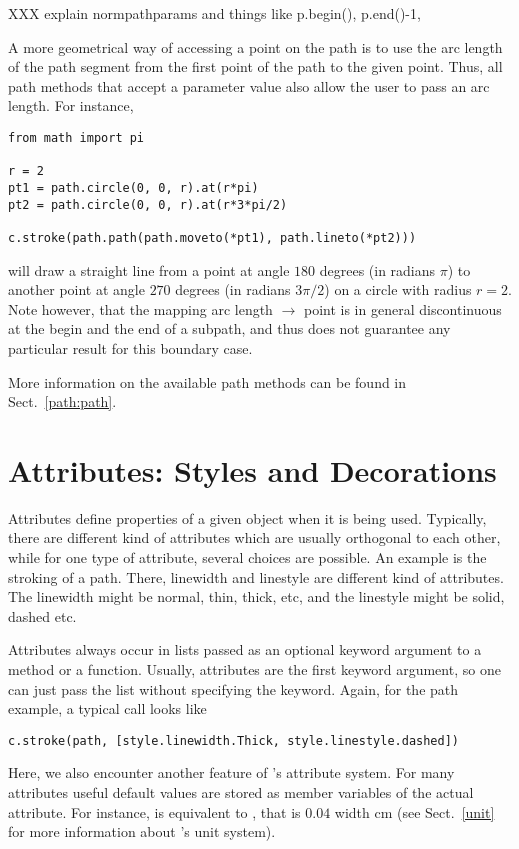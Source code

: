 XXX explain normpathparams and things like p.begin(), p.end()-1,

A more geometrical way of accessing a point on the path is to use the
arc length of the path segment from the first point of the path to the
given point. Thus, all \PyX{} path methods that accept a parameter
value also allow the user to pass an arc length. For instance,
\begin{verbatim}
from math import pi

r = 2
pt1 = path.circle(0, 0, r).at(r*pi)
pt2 = path.circle(0, 0, r).at(r*3*pi/2)

c.stroke(path.path(path.moveto(*pt1), path.lineto(*pt2)))
\end{verbatim}
will draw a straight line from a point at angle $180$ degrees (in
radians $\pi$) to another point at angle $270$ degrees (in radians
$3\pi/2$) on a circle with radius $r=2$. Note however, that the mapping arc
length $\to$ point is in general discontinuous at the begin and the
end of a subpath, and thus \PyX{} does not guarantee any particular
result for this boundary case.

More information on the available path methods can be found 
in Sect.~\ref{path:path}. 

\section{Attributes: Styles and Decorations}

\label{graphics:attributes}

Attributes define properties of a given object when it is being used.
Typically, there are different kind of attributes which are usually
orthogonal to each other, while for one type of attribute, several
choices are possible. An example is the stroking of a path. There,
linewidth and linestyle are different kind of attributes. The linewidth
might be normal, thin, thick, etc, and the linestyle might be solid,
dashed etc.

Attributes always occur in lists passed as an optional keyword argument
to a method or a function. Usually, attributes are the first keyword
argument, so one can just pass the list without specifying the keyword.
Again, for the path example, a typical call looks like

\begin{verbatim}
c.stroke(path, [style.linewidth.Thick, style.linestyle.dashed])
\end{verbatim}

Here, we also encounter another feature of \PyX's attribute system. For
many attributes useful default values are stored as member variables of
the actual attribute. For instance,  is
equivalent to , that is
$0.04$ width cm (see Sect.~\ref{unit} for more information about
\PyX's unit system). 

